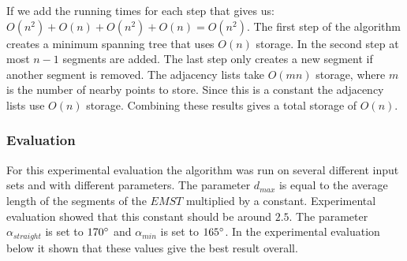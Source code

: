 \documentclass[11pt]{article}
\begin{document}
If we add the running times for each step that gives us: $O(n^2)+O(n)+O(n^2)+O(n)=O(n^2)$. The first step of the algorithm creates a minimum spanning tree that uses $O(n)$ storage. In the second step at most $n-1$ segments are added. The last step only creates a new segment if another segment is removed. The adjacency lists take $O(mn)$ storage, where $m$ is the number of nearby points to store. Since this is a constant the adjacency lists use $O(n)$ storage. Combining these results gives a total storage of $O(n)$.

\subsubsection{Evaluation}
For this experimental evaluation the algorithm was run on several different input sets and with different parameters. The parameter $d_{max}$ is equal to the average length of the segments of the $EMST$ multiplied by a constant. Experimental evaluation showed that this constant should be around $2.5$. The parameter $\alpha_{straight}$ is set to $170\degree$ and $\alpha_{min}$ is set to $165\degree$. In the experimental evaluation below it shown that these values give the best result overall.
\end{document}

